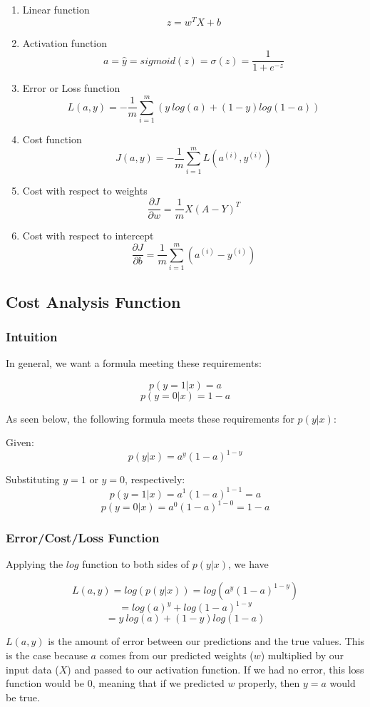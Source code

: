 \documentclass{article}
\begin{document}
\begin{enumerate}
\item Linear function
$$z = w^T X + b$$
\item Activation function
$$a = \hat{y} = sigmoid(z) = \sigma(z) = \frac{1}{1 + e^{-z}}$$
\item Error or Loss function
$$L(a,y) = -\frac{1}{m} \sum_{i=1}^{m} (y\ log(a) + (1-y) log(1-a))$$
\item Cost function
$$J(a,y) = -\frac{1}{m} \sum_{i=1}^{m} L(a^{(i)},y^{(i)})$$
\item Cost with respect to weights
$$\frac{\partial{J}}{\partial{w}} = \frac{1}{m}X(A-Y)^{T}$$
\item Cost with respect to intercept
$$\frac{\partial{J}}{\partial{b}} = \frac{1}{m} \sum_{i=1}^{m}(a^{(i)} - y^{(i)})$$
\end{enumerate}

\subsection{Cost Analysis Function}

\subsubsection{Intuition}

In general, we want a formula meeting these requirements:

$$p(y=1|x) = a$$
$$p(y=0|x) = 1 - a$$

As seen below, the following formula meets these requirements for $p(y | x)$:

Given:
$$p(y|x) = a^{y}(1-a)^{1-y}$$

Substituting $y=1$ or $y=0$, respectively:
$$p(y=1|x) = a^{1}(1-a)^{1-1} = a$$
$$p(y=0|x) = a^{0}(1-a)^{1-0} = 1-a$$

\subsubsection{Error/Cost/Loss Function}

Applying the $log$ function to both sides of $p(y | x)$, we have

$$L(a,y) = log(p(y|x)) = log(a^{y}(1-a)^{1-y})$$
$$= log(a)^y + log (1-a)^{1-y}$$
$$= y\ log(a) + (1-y) log (1-a)$$

$L(a,y)$ is the amount of error between our predictions and the true values.  This is the case because $a$ comes from our predicted weights ($w$) multiplied by our input data ($X$) and passed to our activation function.  If we had no error, this loss function would be 0, meaning that if we predicted $w$ properly, then $y = a$ would be true.
\end{document}
